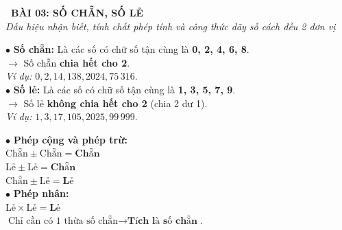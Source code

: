 \documentclass[14pt,a4paper,oneside]{extbook}
\begin{document}
\noindent
\begin{tcolorbox}[
  enhanced,
  colback=teal!8!white,
  colframe=teal!80!black,
  arc=3mm, boxrule=1pt,
  left=3mm, right=3mm, top=2mm, bottom=2mm,
  halign=center
]
  {\Large\bfseries\color{teal!90!black}\faBookmark\ BÀI 03: SỐ CHẴN, SỐ LẺ}\\[1.5pt]
  {\footnotesize\itshape\color{black!75} Dấu hiệu nhận biết, tính chất phép tính và công thức dãy số cách đều 2 đơn vị}
\end{tcolorbox}

\vspace{2.5mm}

\noindent
\begin{minipage}[t]{0.49\textwidth}
  \begin{tcolorbox}[
    enhanced,
    title={\footnotesize\bfseries\color{white}\faCheckCircle\ 1. Khái niệm Số chẵn \& Số lẻ},
    colback=blue!2!white,
    colframe=blue!75!black,
    arc=2.5mm, boxrule=0.8pt, top=1.8mm, bottom=1.8mm, left=2mm, right=2mm
  ]
    \footnotesize
    $\bullet$ \textbf{Số chẵn:} Là các số có chữ số tận cùng là \textbf{0, 2, 4, 6, 8}.\\
    $\rightarrow$ Số chẵn \textbf{chia hết cho 2}.\\
    \textit{Ví dụ:} $0, 2, 14, 138, 2024, 75\,316$.\\
    $\bullet$ \textbf{Số lẻ:} Là các số có chữ số tận cùng là \textbf{1, 3, 5, 7, 9}.\\
    $\rightarrow$ Số lẻ \textbf{không chia hết cho 2} (chia 2 dư 1).\\
    \textit{Ví dụ:} $1, 3, 17, 105, 2025, 99\,999$.
  \end{tcolorbox}
\end{minipage}%
\hfill
\begin{minipage}[t]{0.49\textwidth}
  \begin{tcolorbox}[
    enhanced,
    title={\footnotesize\bfseries\color{white}\faCogs\ 2. Quy tắc tính chẵn lẻ},
    colback=teal!2!white,
    colframe=teal!75!black,
    arc=2.5mm, boxrule=0.8pt, top=1.8mm, bottom=1.8mm, left=2mm, right=2mm
  ]
    \footnotesize
    $\bullet$ \textbf{Phép cộng và phép trừ:}\\
    $\text{Chẵn} \pm \text{Chẵn} = \textbf{Chẵn}$\\
    $\text{Lẻ} \pm \text{Lẻ} = \textbf{Chẵn}$\\
    $\text{Chẵn} \pm \text{Lẻ} = \textbf{Lẻ}$\\
    $\bullet$ \textbf{Phép nhân:}\\
    $\text{Lẻ} \times \text{Lẻ} = \textbf{Lẻ}$\\
    $\text{Chỉ cần có 1 thừa số chẵn} \rightarrow \textbf{Tích là số chẵn}$.
  \end{tcolorbox}
\end{minipage}
\end{document}
